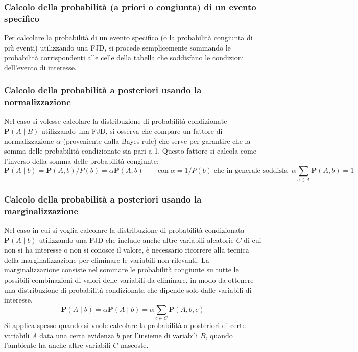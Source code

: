 \subsubsection*{Calcolo della probabilità (a priori o congiunta) di un evento specifico}
Per calcolare la probabilità di un evento specifico (o la probabilità congiunta di più eventi) utilizzando una FJD,
si procede semplicemente sommando le probabilità corrispondenti alle celle della tabella che soddisfano le condizioni
dell'evento di interesse.

\subsubsection*{Calcolo della probabilità a posteriori usando la normalizzazione}
Nel caso si volesse calcolare la distribuzione di probabilità condizionate \(\textbf{P}(A \mid B)\) utilizzando una FJD,
si osserva che compare un fattore di normalizzazione \(\alpha\) (proveniente dalla Bayes rule) che serve per garantire
che la somma delle probabilità condizionate sia pari a 1. Questo fattore si calcola come l'inverso della somma delle
probabilità congiunte:
\[\textbf{P}(A \mid b) = \textbf{P}(A, b) / P(b) = \alpha \textbf{P}(A, b) \qquad \text{con} \; \alpha = 1 / P(b) \; \text{che in generale soddisfa} \;\; \alpha \sum_{a \in A} \textbf{P}(A, b) = 1\]

\subsubsection*{Calcolo della probabilità a posteriori usando la marginalizzazione}
Nel caso in cui si voglia calcolare la distribuzione di probabilità condizionata \(\textbf{P}(A \mid b)\) utilizzando una FJD
che include anche altre variabili aleatorie \(C\) di cui non si ha interesse o non si conosce il valore, è necessario
ricorrere alla tecnica della marginalizzazione per eliminare le variabili non rilevanti. La marginalizzazione consiste
nel sommare le probabilità congiunte su tutte le possibili combinazioni di valori delle variabili da eliminare, in modo
da ottenere una distribuzione di probabilità condizionata che dipende solo dalle variabili di interesse.
\[\textbf{P}(A \mid b) = \alpha \textbf{P}(A \mid b) = \alpha \sum_{c \in C} \textbf{P}(A, b, c)\]
Si applica spesso quando si vuole calcolare la probabilità a posteriori di certe variabili \(A\) data una certa evidenza \(b\) 
per l'insieme di variabili \(B\), quando l'ambiente ha anche altre variabili \(C\) nascoste.

